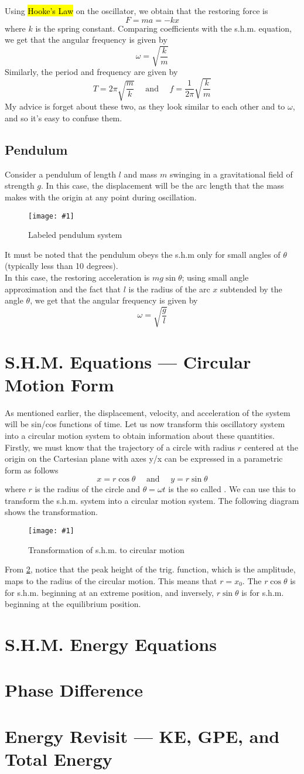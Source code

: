 \documentclass[a4paper,12pt]{article}
\let\oldsection\section
\renewcommand\section{\clearpage\oldsection}
\newcommand{\lb}{\\[8pt]}
\newcommand{\img}[4]{\begin{center}
  \begin{figure}[H]
    \centering
    \texttt{[image: \#1]}
    \caption{#3}
    \label{fig:#4}
  \end{figure}
\end{center}}
\begin{document}
Using \hl{Hooke's Law} on the oscillator, we obtain that the restoring force is
$$F = ma = -kx$$
where $k$ is the spring constant. Comparing coefficients with the s.h.m. equation, we get that the angular frequency is given by
$$\omega = \sqrt{\frac{k}{m}}$$
Similarly, the period and frequency are given by
$$T = 2\pi\sqrt{\frac{m}{k}}\quad\text{ and }\quad f = \frac{1}{2\pi}\sqrt{\frac{k}{m}}$$
My advice is forget about these two, as they look similar to each other and to $\omega$, and so it's easy to confuse them.

\pagebreak

\subsection{Pendulum}

Consider a pendulum of length $l$ and mass $m$ swinging in a gravitational field of strength $g$. In this case, the displacement will be the arc length that the mass makes with the origin at any point during oscillation.
\img{pendulumlabeled.png}{0.6}{Labeled pendulum system}{pendulumlabeled}
It must be noted that the pendulum obeys the s.h.m only for small angles of $\theta$ (typically less than 10 degrees).\lb
In this case, the restoring acceleration is $mg\sin\theta$; using small angle approximation and the fact that $l$ is the radius of the arc $x$ subtended by the angle $\theta$, we get that the angular frequency is given by
\begin{equation}
  \omega = \sqrt{\frac{g}{l}}
\end{equation}

\section{S.H.M. Equations --- Circular Motion Form}
As mentioned earlier, the displacement, velocity, and acceleration of the system will be sin/cos functions of time. Let us now transform this oscillatory system into a circular motion system to obtain information about these quantities.\lb
Firstly, we must know that the trajectory of a circle with radius $r$ centered at the origin on the Cartesian plane with axes y/x can be expressed in a parametric form as follows
$$x = r\cos\theta\quad\text{ and }\quad y = r\sin\theta$$
where $r$ is the radius of the circle and $\theta = \omega t$ is the so called . We can use this to transform the s.h.m. system into a circular motion system. The following diagram shows the transformation.
\img{circ.png}{0.6}{Transformation of s.h.m. to circular motion}{circ}
From \cref{fig:circ}, notice that the peak height of the trig. function, which is the amplitude, maps to the radius of the circular motion. This means that $r = x_0$. The $r\cos \theta$ is for s.h.m. beginning at an extreme position, and inversely, $r\sin \theta$ is for s.h.m. beginning at the equilibrium position.

\section{S.H.M. Energy Equations}

\section{Phase Difference}

\section{Energy Revisit --- KE, GPE, and Total Energy}
\end{document}
